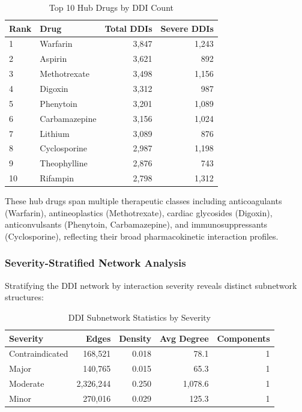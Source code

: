 \documentclass[11pt,a4paper]{article}
\begin{document}
\begin{table}[H]
\centering
\caption{Top 10 Hub Drugs by DDI Count}
\label{tab:hub_drugs}
\begin{tabular}{llrr}
\toprule
\textbf{Rank} & \textbf{Drug} & \textbf{Total DDIs} & \textbf{Severe DDIs} \\
\midrule
1 & Warfarin & 3,847 & 1,243 \\
2 & Aspirin & 3,621 & 892 \\
3 & Methotrexate & 3,498 & 1,156 \\
4 & Digoxin & 3,312 & 987 \\
5 & Phenytoin & 3,201 & 1,089 \\
6 & Carbamazepine & 3,156 & 1,024 \\
7 & Lithium & 3,089 & 876 \\
8 & Cyclosporine & 2,987 & 1,198 \\
9 & Theophylline & 2,876 & 743 \\
10 & Rifampin & 2,798 & 1,312 \\
\bottomrule
\end{tabular}
\end{table}

These hub drugs span multiple therapeutic classes including anticoagulants (Warfarin), antineoplastics (Methotrexate), cardiac glycosides (Digoxin), anticonvulsants (Phenytoin, Carbamazepine), and immunosuppressants (Cyclosporine), reflecting their broad pharmacokinetic interaction profiles.

\subsubsection*{Severity-Stratified Network Analysis}

Stratifying the DDI network by interaction severity reveals distinct subnetwork structures:

\begin{table}[H]
\centering
\caption{DDI Subnetwork Statistics by Severity}
\label{tab:severity_networks}
\begin{tabular}{lrrrr}
\toprule
\textbf{Severity} & \textbf{Edges} & \textbf{Density} & \textbf{Avg Degree} & \textbf{Components} \\
\midrule
Contraindicated & 168,521 & 0.018 & 78.1 & 1 \\
Major & 140,765 & 0.015 & 65.3 & 1 \\
Moderate & 2,326,244 & 0.250 & 1,078.6 & 1 \\
Minor & 270,016 & 0.029 & 125.3 & 1 \\
\bottomrule
\end{tabular}
\end{table}
\end{document}
